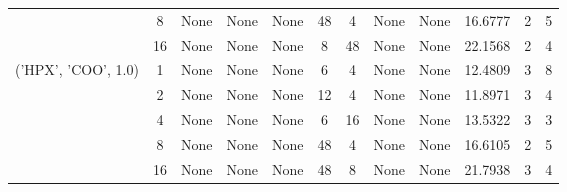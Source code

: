 \begin{tabular}{cccccccccccc}
& 8& None& None& None& 48& 4& None& None& 16.6777& 2& 5\\
& 16& None& None& None& 8& 48& None& None& 22.1568& 2& 4\\
\hline
\multirow{5}{*}{('HPX', 'COO', 1.0)}& 1& None& None& None& 6& 4& None& None& 12.4809& 3& 8\\
& 2& None& None& None& 12& 4& None& None& 11.8971& 3& 4\\
& 4& None& None& None& 6& 16& None& None& 13.5322& 3& 3\\
& 8& None& None& None& 48& 4& None& None& 16.6105& 2& 5\\
& 16& None& None& None& 48& 8& None& None& 21.7938& 3& 4\\
\hline
\end{tabular}
